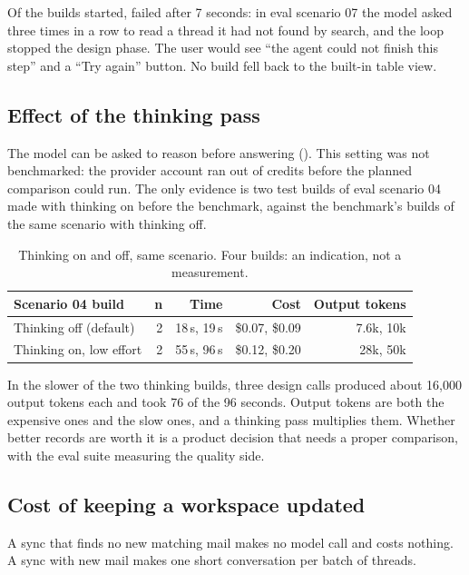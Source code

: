 Of the \Nnbuildsall{} builds started, \Nnbuildfail{} failed after 7 seconds: in eval scenario 07 the
model asked three times in a row to read a thread it had not found by search, and the loop
stopped the design phase. The user would see ``the agent could not finish this step'' and a
``Try again'' button. No build fell back to the built-in table view.

\subsection{Effect of the thinking pass}
\label{sec:thinking}

The model can be asked to reason before answering (). This
setting was not benchmarked: the provider account ran out of credits before the planned
comparison could run. The only evidence is two test builds of eval scenario 04 made with
thinking on before the benchmark, against the benchmark's builds of the same scenario with
thinking off.

\begin{table}[H]
\centering\small
\begin{tabularx}{0.8\linewidth}{@{}Lrrrr@{}}
\toprule
\textbf{Scenario 04 build} & \textbf{n} & \textbf{Time} & \textbf{Cost} & \textbf{Output tokens} \\
\midrule
Thinking off (default) & 2 & 18\,s, 19\,s & \$0.07, \$0.09 & 7.6k, 10k \\
Thinking on, low effort & 2 & 55\,s, 96\,s & \$0.12, \$0.20 & 28k, 50k \\
\bottomrule
\end{tabularx}
\caption{Thinking on and off, same scenario. Four builds: an indication, not a measurement.}
\end{table}

In the slower of the two thinking builds, three design calls produced about 16,000 output
tokens each and took 76 of the 96 seconds. Output tokens are both the expensive ones and the
slow ones, and a thinking pass multiplies them. Whether better records are worth it is a
product decision that needs a proper comparison, with the eval suite measuring the quality
side.

\subsection{Cost of keeping a workspace updated}
\label{sec:upkeep}

A sync that finds no new matching mail makes no model call and costs nothing. A sync with new
mail makes one short conversation per batch of threads.

